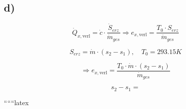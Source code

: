 

\subsection*{d)}

\[
\dot{Q}_{x, \text{verl}} = \dot{c} \cdot \frac{\dot{S}_{erz}}{\dot{m}_{ges}} \Rightarrow e_{x, \text{verl}} = \frac{T_0 \cdot S_{erz}}{\dot{m}_{ges}}
\]

\[
S_{erz} = \dot{m} \cdot (s_2 - s_1), \quad T_0 = 293.15K
\]

\[
\Rightarrow e_{x, \text{verl}} = \frac{T_0 \cdot \dot{m} \cdot (s_2 - s_1)}{\dot{m}_{ges}}
\]

\[
s_2 - s_1 =
\]

``````latex